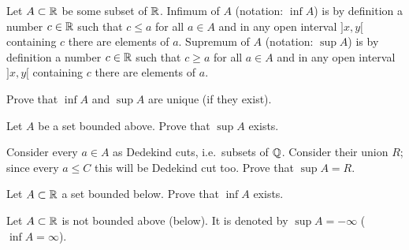 \documentclass[12pt]{article}
\begin{document}
\begin{opredelenie} Let $A\subset {\mathbb R}$ be some subset of 
${\mathbb R}$. Infimum of $A$ (notation: $\inf A$) is by definition a number $c
\in {\mathbb R}$ such that $c \leq a$ for all $a\in A$ and in any open interval
$]x, y[$ containing $c$ there are elements of $a$. Supremum of $A$
(notation: $\sup A$) is by definition a number $c \in {\mathbb R}$ such that $c
\geq a$ for all $a\in A$ and in any open interval $]x, y[$ containing
$c$ there are elements of $a$.
\end{opredelenie}

\begin{zadacha} Prove that $\inf A$ and $\sup A$ are unique (if they
  exist).
\end{zadacha}

\begin{zadacha}[!] Let $A$ be a set bounded above. Prove that $\sup A$
 exists.
\end{zadacha}

\begin{ukazanie} Consider every $a\in A$ as Dedekind cuts,
i.e.\ subsets of ${\mathbb Q}$. Consider their union $R$; since every $a \leq C$
this will be Dedekind cut too. Prove that $\sup A = R$.
\end{ukazanie}

\begin{zadacha}[!] Let $A \subset {\mathbb R}$ a set bounded below.
Prove that $\inf A$ exists.
\end{zadacha}

\begin{zamechanie} Let $A\subset {\mathbb R}$ is not bounded above (below).
It is denoted by $\sup A = -\infty$ ($\inf A = \infty$).
\end{zamechanie}
\end{document}

